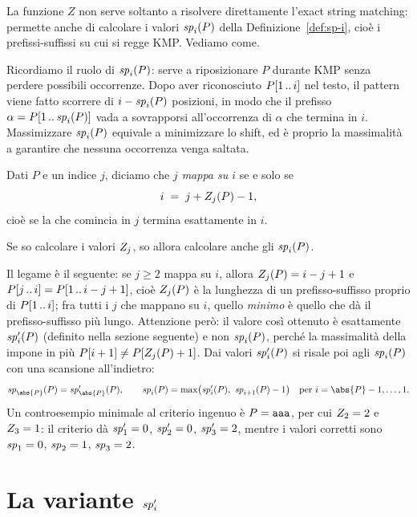 La funzione $Z$ non serve soltanto a risolvere direttamente l'exact string
matching: permette anche di calcolare i valori $\mathit{sp}_{i}(P)$ della
Definizione~\ref{def:sp-i}, cioè i prefissi-suffissi su cui si regge KMP.
Vediamo come.

Ricordiamo il ruolo di $\mathit{sp}_{i}(P)$: serve a riposizionare $P$ durante KMP senza
perdere possibili occorrenze. Dopo aver riconosciuto $P[1\,..\,i]$ nel testo, il
pattern viene fatto scorrere di $i-\mathit{sp}_{i}(P)$ posizioni, in modo che il prefisso
$\alpha=P[1\,..\,\mathit{sp}_{i}(P)]$ vada a sovrapporsi all'occorrenza di $\alpha$ che
termina in $i$. Massimizzare $\mathit{sp}_{i}(P)$ equivale a minimizzare lo shift, ed è
proprio la massimalità a garantire che nessuna occorrenza venga saltata.

\begin{definizione}[$j$ mappa su $i$]\label{def:mappa-su}
  Dati $P$ e un indice $j$, diciamo che \emph{$j$ mappa su $i$} se e solo se
  \[
    i \;=\; j+Z_{j}(P)-1 ,
  \]
  cioè se la \Zbox che comincia in $j$ termina esattamente in $i$.
\end{definizione}

Se so calcolare i valori $Z_{j}$, so allora calcolare anche gli $\mathit{sp}_{i}(P)$.

\begin{osservazione}
  Il legame è il seguente: se $j\ge 2$ mappa su $i$, allora $Z_{j}(P)=i-j+1$ e
  $P[j\,..\,i]=P[1\,..\,i-j+1]$, cioè $Z_{j}(P)$ è la lunghezza di un
  prefisso-suffisso proprio di $P[1\,..\,i]$; fra tutti i $j$ che mappano su $i$,
  quello \emph{minimo} è quello che dà il prefisso-suffisso più lungo. Attenzione
  però: il valore così ottenuto è esattamente $\mathit{sp}'_{i}(P)$ (definito nella
  sezione seguente) e non $\mathit{sp}_{i}(P)$, perché la massimalità della \Zbox impone
  in più $P[i+1]\ne P[Z_{j}(P)+1]$. Dai valori $\mathit{sp}'_{i}(P)$ si risale poi agli
  $\mathit{sp}_{i}(P)$ con una scansione all'indietro:
  \[
    \spv{\abs{P}}(P)=\spp{\abs{P}}(P),
    \qquad
    \spv{i}(P)=\max\bigl(\spp{i}(P),\ \spv{i+1}(P)-1\bigr)
    \quad\text{per } i=\abs{P}-1,\dots,1 .
  \]
  Un controesempio minimale al criterio ingenuo è $P=\texttt{aaa}$, per cui
  $Z_{2}=2$ e $Z_{3}=1$: il criterio dà $\mathit{sp}'_{1}=0$, $\mathit{sp}'_{2}=0$, $\mathit{sp}'_{3}=2$,
  mentre i valori corretti sono $\mathit{sp}_{1}=0$, $\mathit{sp}_{2}=1$, $\mathit{sp}_{3}=2$.
\end{osservazione}

\section{La variante \texorpdfstring{$\mathit{sp}'_{i}$}{sp'\_i}}
\label{sec:sp-primo}

